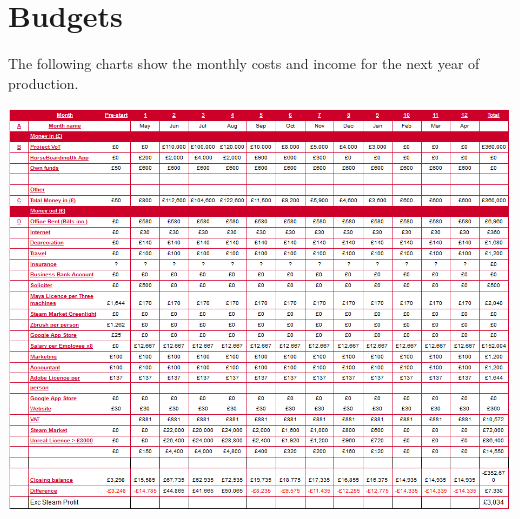 \documentclass{scrartcl}
\begin{document}
\newpage
\section{Budgets}

The following charts show the monthly costs and income for the next year of production.
\newline
\begin{center}
	\includegraphics[scale=0.56]{CostsChart}	
	\newline
\end{center}
\end{document}

